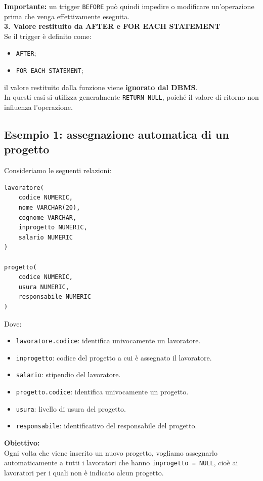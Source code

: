 \noindent
\textbf{Importante:} un trigger \texttt{BEFORE}
può quindi impedire o modificare un'operazione
prima che venga effettivamente eseguita.\medskip\\
\textbf{3. Valore restituito da AFTER e FOR EACH STATEMENT}\\
Se il trigger è definito come:
\begin{itemize}
    \item \texttt{AFTER};
    \item \texttt{FOR EACH STATEMENT};
\end{itemize}
\noindent
il valore restituito dalla funzione viene
\textbf{ignorato dal DBMS}.\\
In questi casi si utilizza generalmente
\texttt{RETURN NULL}, poiché il valore
di ritorno non influenza l'operazione.

\subsection{Esempio 1: assegnazione automatica di un progetto}
Consideriamo le seguenti relazioni:
\begin{verbatim}
lavoratore(
    codice NUMERIC,
    nome VARCHAR(20),
    cognome VARCHAR,
    inprogetto NUMERIC,
    salario NUMERIC
)

progetto(
    codice NUMERIC,
    usura NUMERIC,
    responsabile NUMERIC
)
\end{verbatim}
\noindent
Dove:
\begin{itemize}
    \item \texttt{lavoratore.codice}: identifica
    univocamente un lavoratore.
    \item \texttt{inprogetto}: codice del progetto
    a cui è assegnato il lavoratore.
    \item \texttt{salario}: stipendio del lavoratore.
    \item \texttt{progetto.codice}: identifica
    univocamente un progetto.
    \item \texttt{usura}: livello di usura del progetto.
    \item \texttt{responsabile}: identificativo
    del responsabile del progetto.
\end{itemize}
\noindent
\textbf{Obiettivo:}\\
Ogni volta che viene inserito un nuovo progetto,
vogliamo assegnarlo automaticamente a tutti
i lavoratori che hanno \texttt{inprogetto = NULL},
cioè ai lavoratori per i quali non è indicato
alcun progetto.\medskip\\
